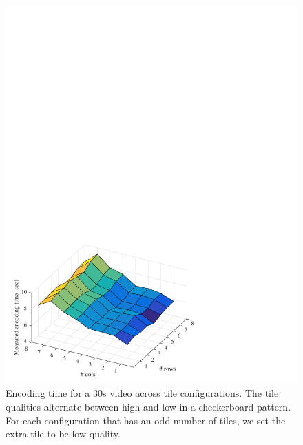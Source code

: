 \begin{figure}[t]
	\includegraphics[width=\columnwidth]{figures/times_v1.pdf}
	\caption{Encoding time for a 30s video across tile configurations. The tile qualities alternate between high and low in a checkerboard pattern. For each configuration that has an odd number of tiles, we set the extra tile to be low quality.}
	\label{fig:time}
\end{figure}


